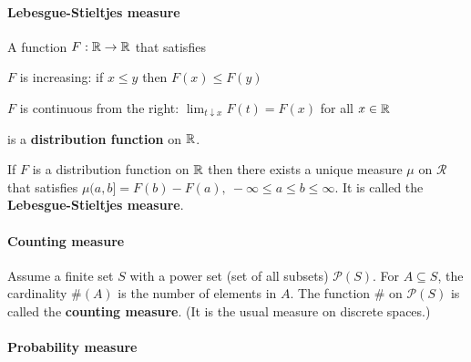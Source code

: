 \paragraph{Lebesgue-Stieltjes measure}

\begin{definition}
A function $F : \mathbb{R} \to \mathbb{R}$  that satisfies
\begin{compactitem}
\item $F$ is increasing: if $x \leq y$ then $F(x) \leq F(y)$
\item $F$ is continuous from the right: $\lim_{t \downarrow x} F(t) = F(x)$ for all $x \in \mathbb{R}$
\end{compactitem}
is a \textbf{distribution function} on $\mathbb{R}$.
\end{definition}

\begin{definition}
If $F$ is a distribution function on $\mathbb{R}$ then there exists a unique measure $\mu$ on $\mathscr{R}$ that satisfies $\mu(a, b] = F(b) - F(a), \ -\infty \leq a \leq b \leq \infty$. It is called the \textbf{Lebesgue-Stieltjes measure}.
\end{definition}

\paragraph{Counting measure}

\begin{definition}
Assume a finite set $S$ with a power set (set of all subsets) $\mathscr{P}(S)$.
For $A \subseteq S$, the cardinality $\#(A)$ is the number of elements in $A$. The function $\#$ on $\mathscr{P}(S)$ is called the \textbf{counting measure}. (It is the usual measure on discrete spaces.)
\end{definition}

\paragraph{Probability measure}

